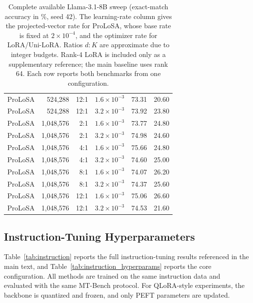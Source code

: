 \begin{table}[p]
\begin{tabular}{lrrrrr}
ProLoSA & 524,288 & 12:1 & $1.6\times10^{-3}$ & 73.31 & 20.60 \\
ProLoSA & 524,288 & 12:1 & $3.2\times10^{-3}$ & 73.92 & 23.80 \\
ProLoSA & 1,048,576 & 2:1 & $1.6\times10^{-3}$ & 73.77 & 24.80 \\
ProLoSA & 1,048,576 & 2:1 & $3.2\times10^{-3}$ & 74.98 & 24.60 \\
ProLoSA & 1,048,576 & 4:1 & $1.6\times10^{-3}$ & 75.66 & 24.80 \\
ProLoSA & 1,048,576 & 4:1 & $3.2\times10^{-3}$ & 74.60 & 25.00 \\
ProLoSA & 1,048,576 & 8:1 & $1.6\times10^{-3}$ & 74.07 & 26.20 \\
ProLoSA & 1,048,576 & 8:1 & $3.2\times10^{-3}$ & 74.37 & 25.60 \\
ProLoSA & 1,048,576 & 12:1 & $1.6\times10^{-3}$ & 75.06 & 26.60 \\
ProLoSA & 1,048,576 & 12:1 & $3.2\times10^{-3}$ & 74.53 & 21.60 \\
\bottomrule
\end{tabular}
\caption{Complete available Llama-3.1-8B sweep (exact-match accuracy in \%, seed 42). The learning-rate column gives the projected-vector rate for ProLoSA, whose base rate is fixed at $2\times10^{-4}$, and the optimizer rate for LoRA/Uni-LoRA. Ratios $d:K$ are approximate due to integer budgets. Rank-4 LoRA is included only as a supplementary reference; the main baseline uses rank 64. Each row reports both benchmarks from one configuration.}
\label{tab:llama31_math_sweep}
\end{table}

\subsection{Instruction-Tuning Hyperparameters}

Table~\ref{tab:instruction} reports the full instruction-tuning results referenced in the main text, and Table~\ref{tab:instruction_hyperparams} reports the core configuration.
All methods are trained on the same instruction data and evaluated with the same MT-Bench protocol.
For QLoRA-style experiments, the backbone is quantized and frozen, and only PEFT parameters are updated.

